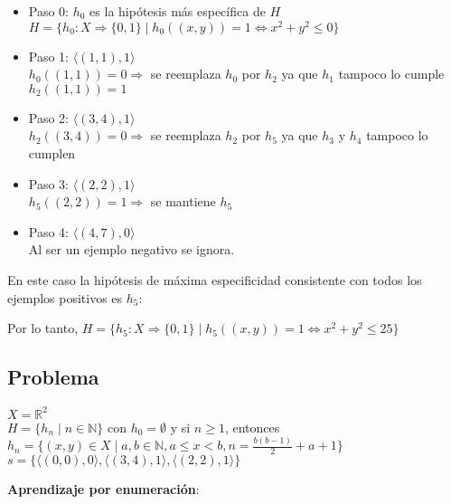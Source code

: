 \documentclass{article}
\begin{document}
\begin{itemize}
    \item Paso 0: \(h_0\) es la hipótesis más específica de \(H\)
    \\ \(H = \{h_0 : X \Rightarrow \{0, 1\} \mid h_0 ((x, y)) = 1 \Leftrightarrow  x^2 + y^2 \leq 0 \}\)
    \item Paso 1: \(\langle(1, 1), 1\rangle\)
    \\ \(h_0 ((1, 1)) = 0 \Rightarrow\) se reemplaza \(h_0\) por \(h_2\) ya que \(h_1\) tampoco lo cumple 
    \\ \(h_2 ((1, 1)) = 1\)
    \item Paso 2: \(\langle(3, 4), 1\rangle\)
    \\ \(h_2((3, 4)) = 0 \Rightarrow\) se reemplaza \(h_2\) por \(h_5\) ya que \(h_3\) y \(h_4\) tampoco lo cumplen
    \item Paso 3: \(\langle(2, 2), 1\rangle\)
    \\ \(h_5((2, 2)) = 1 \Rightarrow\) se mantiene \(h_5\)
    \item Paso 4: \(\langle(4, 7), 0\rangle\)
    \\ Al ser un ejemplo negativo se ignora.
\end{itemize}
En este caso la hipótesis de máxima especificidad consistente con todos los ejemplos positivos es \(h_5\):
\begin{center}
Por lo tanto, \(H = \{h_5 : X \Rightarrow \{0, 1\} \mid h_5 ((x, y)) = 1 \Leftrightarrow  x^2 + y^2 \leq 25 \}\)
\end{center}


\subsection{Problema}
\begin{flushleft}
\(X = \mathbb R^2\)\\
\(H = \{h_n \mid n \in \mathbb N\}\) con \(h_0 = \emptyset \) y si \(n \geq 1\), entonces \(h_n = \{(x, y) \in X \mid a, b \in \mathbb N, a \leq x < b, n = \frac{b(b-1)}{2}+ a + 1\}\)\\
\(s = \{\langle(0, 0), 0\rangle, \langle(3, 4), 1\rangle, \langle(2, 2), 1\rangle \}\)
\end{flushleft}

\textbf{Aprendizaje por enumeración}: 
\end{document}
